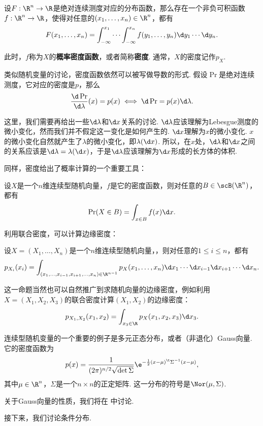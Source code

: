 \begin{theorem}\label{thm:continuous-vector}
设$F:\R^n\to\R$是绝对连续测度对应的分布函数，那么存在一个非负可积函数$f:\R^n\to\R$，使得对任意的$(x_1,\dots,x_n)\in\R^n$，都有
\[F(x_1,\dots,x_n)=\int_{-\infty}^{x_1}\cdots\int_{-\infty}^{x_n}f(y_1,\dots,y_n)\d y_1\cdots\d y_n.\]
\end{theorem}

此时，$f$称为$X$的\textbf{概率密度函数}，或者简称\textbf{密度}. 通常，$X$的密度记作$p_X$.

类似随机变量的讨论，密度函数依然可以被写做导数的形式. 假设$\Pr$是绝对连续测度，它对应的密度是$p$，那么
\[\frac{\d\Pr}{\d\lambda}(x)=p(x)\iff \d\Pr=p(x)\d\lambda.\]

这里，我们需要再给出一些$\d\lambda$和$\d x$关系的讨论. $\d\lambda$应该理解为Lebesgue测度的微小变化，然而我们并不假定这一变化是如何产生的. $\d x$理解为$x$的微小变化. $x$的微小变化自然就产生了$\lambda$的微小变化，即$\lambda(\d x)$. 所以，在$x$处，$\d\lambda$和$\d x$之间的关系应该是$\d\lambda=\lambda(\d x)$，于是$\d\lambda$应该理解为$\d x$形成的长方体的体积. 

同样，密度给出了概率计算的一个重要工具：
\begin{theorem}\label{thm:continuous-prob-vec}
    设$X$是一个$n$维连续型随机向量，$f$是它的密度函数，则对任意的$B\in\scB(\R^n)$，都有
    \[\Pr(X\in B)=\int_{x\in B}f(x)\d x.\]
\end{theorem}

利用联合密度，可以计算边缘密度：
\begin{theorem}\label{thm:continuous-marginal}
    设$X=(X_1,\dots,X_n)$是一个$n$维连续型随机向量，，则对任意的$1\leq i\leq n$，都有
    \[p_{X_i}(x_i)=\int_{(x_1,\dots,x_{i-1},x_{i+1},\dots,x_n)\in\R^{n-1}}p_X(x_1,\dots,x_n)\d x_1\cdots\d x_{i-1}\d x_{i+1}\cdots\d x_n.\]
\end{theorem}

这一命题当然也可以自然推广到求随机向量的边缘密度，例如利用$X=(X_1,X_2,X_3)$的联合密度计算$(X_1,X_2)$的边缘密度：
\[
    p_{X_1,X_2}(x_1,x_2) = \int_{x_3\in\R}p_X(x_1,x_2,x_3)\d x_3.
\]

连续型随机变量的一个重要的例子是多元正态分布，或者（非退化）Gauss向量. 它的密度函数为
\[p(x)=\frac{1}{(2\pi)^{n/2}\sqrt{\det\Sigma}}\e^{-\frac{1}{2}(x-\mu)^\t\Sigma^{-1}(x-\mu)},\]
其中$\mu\in\R^n$，$\Sigma$是一个$n\times n$的正定矩阵. 这一分布的符号是$\Nor(\mu,\Sigma)$. 

关于Gauss向量的性质，我们将在 中讨论. 

接下来，我们讨论条件分布. 

